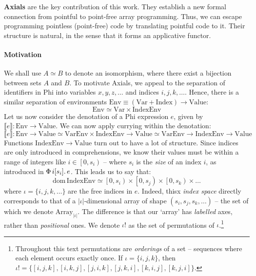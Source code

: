 \textbf{Axials} are the key contribution of this work. They establish a new formal connection from pointful to point-free array programming. Thus, we can escape programming pointless (point-free) code by translating pointful code to it. Their structure is natural, in the sense that it forms an applicative functor.


\newcommand{\sizeat}[1]{s_{#1}}
\newcommand{\altsizeat}[1]{S_{#1}}
\newcommand{\denotindex}{\mathrm{Index}}
\newcommand{\denotvalue}{\mathrm{Value}}
\newcommand{\denotvar}{\mathrm{Var}}
\newcommand{\denotenv}{\mathrm{Env}}
\newcommand{\denotenvindex}{\mathrm{IndexEnv}}
\newcommand{\denotenvvar}{\mathrm{VarEnv}}


\paragraph{Motivation}
We shall use $A \simeq B$ to denote an isomorphism, where there exist a bijection between sets $A$ and $B$. To motivate Axials, we appeal to the separation of identifiers in Phi into variables $x, y, z, \dots$ and indices $i, j, k, \dots$. Hence, there is a similar separation of environments $\denotenv \equiv (\denotvar + \denotindex) \to \denotvalue$:
$$ \denotenv \simeq \denotvar \times \denotenvindex $$
Let us now consider the denotation of a Phi expression $e$, given by $\llbracket e \rrbracket : \denotenv \to \denotvalue$. We can now apply currying within the denotation:
$$\llbracket e \rrbracket : \denotenv \to \denotvalue \simeq \denotenvvar \times \denotenvindex \to \denotvalue \simeq \denotenvvar \to \boxed{\denotenvindex \to \denotvalue}$$
Functions $\denotenvindex \to \denotvalue$ turn out to have a lot of structure.
Since indices are only introduced in  comprehensions, we know their values must be within a range of integers like $i \in \left[ 0, \sizeat i \right)$
-- where $\sizeat i$ is the \textit{size} of an index $i$, as introduced in $\phivec{i}{\sizeat i}{e}$. 
This leads us to say that:
$$ \mathrm{dom}\,\denotenvindex \simeq \left[0, \sizeat i \right) \times \left[0, \sizeat j \right) \times \left[0, \sizeat k \right) \times \dots $$ 
where $\iota = \{i, j, k, \dots \}$ are the free indices in $e$.%
\newcommand{\denotarrayiota}{\mathrm{Array}_{|\iota|}}
Indeed, thisx \textit{index space} directly corresponds to that of a $|\iota|$-dimensional array of shape $(\sizeat i, \sizeat j, \sizeat k, \dots)$ -- the set of which we denote $\denotarrayiota$. 
The difference is that our `array' has \textit{labelled} axes, rather than \textit{positional} ones.
We denote $\iota!$ as the set of permutations of $\iota$.\footnote{Throughout this text permutations are \textit{orderings} of a set -- sequences where each element occurs exactly once. If $\iota = \{i, j, k\}$, then $\iota! = \{[i, j, k], [i, k, j], [j, i, k], [j, k, i], [k, i, j], [k, j, i]\}$.}
